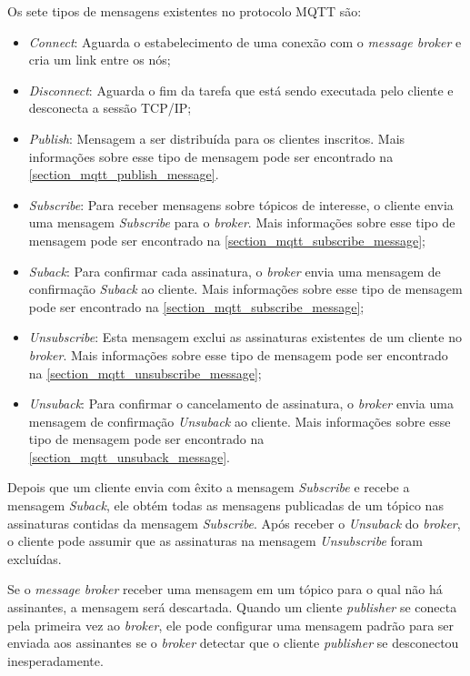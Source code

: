 \documentclass[
    12pt,
    openright,
    twoside,
    a4paper,
    english,
    spanish,
    brazil,
    ]{abntex2}
\begin{document}
Os sete tipos de mensagens existentes no protocolo MQTT são:
\begin{itemize}
	\item \textit{Connect}: Aguarda o estabelecimento de uma conexão com o \textit{message broker} e cria um link entre os nós;
	\item \textit{Disconnect}: Aguarda o fim da tarefa que está sendo executada pelo cliente e desconecta a sessão TCP/IP;
	\item \textit{Publish}: Mensagem a ser distribuída para os clientes inscritos. Mais informações sobre esse tipo de mensagem pode ser encontrado na \autoref{section_mqtt_publish_message}.
	\item \textit{Subscribe}: Para receber mensagens sobre tópicos de interesse, o cliente envia uma mensagem \textit{Subscribe} para o \textit{broker}. Mais informações sobre esse tipo de mensagem pode ser encontrado na \autoref{section_mqtt_subscribe_message};
	\item \textit{Suback}: Para confirmar cada assinatura, o \textit{broker} envia uma mensagem de confirmação \textit{Suback} ao cliente. Mais informações sobre esse tipo de mensagem pode ser encontrado na \autoref{section_mqtt_subscribe_message};
	\item \textit{Unsubscribe}: Esta mensagem exclui as assinaturas existentes de um cliente no \textit{broker}. Mais informações sobre esse tipo de mensagem pode ser encontrado na \autoref{section_mqtt_unsubscribe_message};
	\item \textit{Unsuback}: Para confirmar o cancelamento de assinatura, o \textit{broker} envia uma mensagem de confirmação \textit{Unsuback} ao cliente. Mais informações sobre esse tipo de mensagem pode ser encontrado na \autoref{section_mqtt_unsuback_message}.
\end{itemize}

Depois que um cliente envia com êxito a mensagem \textit{Subscribe} e recebe a mensagem \textit{Suback}, ele obtém todas as mensagens publicadas de um tópico nas assinaturas contidas da mensagem \textit{Subscribe}. Após receber o \textit{Unsuback} do \textit{broker}, o cliente pode assumir que as assinaturas na mensagem \textit{Unsubscribe} foram excluídas.

Se o \textit{message broker} receber uma mensagem em um tópico para o qual não há assinantes, a mensagem será descartada. Quando um cliente \textit{publisher} se conecta pela primeira vez ao \textit{broker}, ele pode configurar uma mensagem padrão para ser enviada aos assinantes se o \textit{broker} detectar que o cliente \textit{publisher} se desconectou inesperadamente.
\end{document}
